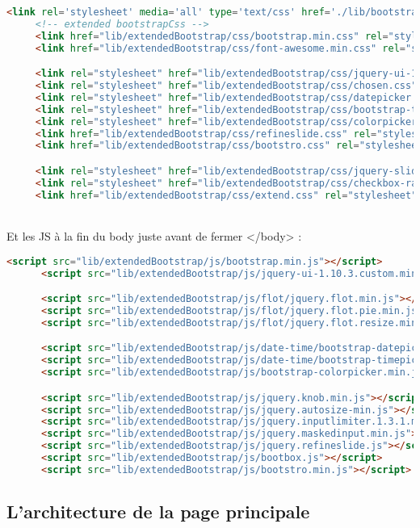 \begin{DDbox}{\linewidth}
\begin{lstlisting}[language=html]
  <link rel='stylesheet' media='all' type='text/css' href='./lib/bootstrap-3.3.4/dist/css/bootstrap.css' />
	 <!-- extended bootstrapCss -->
	 <link href="lib/extendedBootstrap/css/bootstrap.min.css" rel="stylesheet" />
	 <link href="lib/extendedBootstrap/css/font-awesome.min.css" rel="stylesheet" />

	 <link rel="stylesheet" href="lib/extendedBootstrap/css/jquery-ui-1.10.3.custom.min.css" />
	 <link rel="stylesheet" href="lib/extendedBootstrap/css/chosen.css" />
	 <link rel="stylesheet" href="lib/extendedBootstrap/css/datepicker.css" />
	 <link rel="stylesheet" href="lib/extendedBootstrap/css/bootstrap-timepicker.css" />
	 <link rel="stylesheet" href="lib/extendedBootstrap/css/colorpicker.css" />
	 <link href="lib/extendedBootstrap/css/refineslide.css" rel="stylesheet" />
	 <link href="lib/extendedBootstrap/css/bootstro.css" rel="stylesheet" />

	 <link rel="stylesheet" href="lib/extendedBootstrap/css/jquery-slider.css" />
	 <link rel="stylesheet" href="lib/extendedBootstrap/css/checkbox-radio-switch.css" />
	 <link href="lib/extendedBootstrap/css/extend.css" rel="stylesheet" />
\end{lstlisting}
\end{DDbox}
\\
Et les JS à la fin du body juste avant de fermer </body> :\\
\begin{DDbox}{\linewidth}
\begin{lstlisting}[language=html]
  <script src="lib/extendedBootstrap/js/bootstrap.min.js"></script>
      <script src="lib/extendedBootstrap/js/jquery-ui-1.10.3.custom.min.js"></script>

      <script src="lib/extendedBootstrap/js/flot/jquery.flot.min.js"></script>
      <script src="lib/extendedBootstrap/js/flot/jquery.flot.pie.min.js"></script>
      <script src="lib/extendedBootstrap/js/flot/jquery.flot.resize.min.js"></script>

      <script src="lib/extendedBootstrap/js/date-time/bootstrap-datepicker.min.js"></script>
      <script src="lib/extendedBootstrap/js/date-time/bootstrap-timepicker.min.js"></script>
      <script src="lib/extendedBootstrap/js/bootstrap-colorpicker.min.js"></script>

      <script src="lib/extendedBootstrap/js/jquery.knob.min.js"></script>
      <script src="lib/extendedBootstrap/js/jquery.autosize-min.js"></script>
      <script src="lib/extendedBootstrap/js/jquery.inputlimiter.1.3.1.min.js"></script>
      <script src="lib/extendedBootstrap/js/jquery.maskedinput.min.js"></script>
      <script src="lib/extendedBootstrap/js/jquery.refineslide.js"></script>
      <script src="lib/extendedBootstrap/js/bootbox.js"></script>
      <script src="lib/extendedBootstrap/js/bootstro.min.js"></script>
\end{lstlisting}
\end{DDbox}
\subsection{L'architecture de la page principale}

